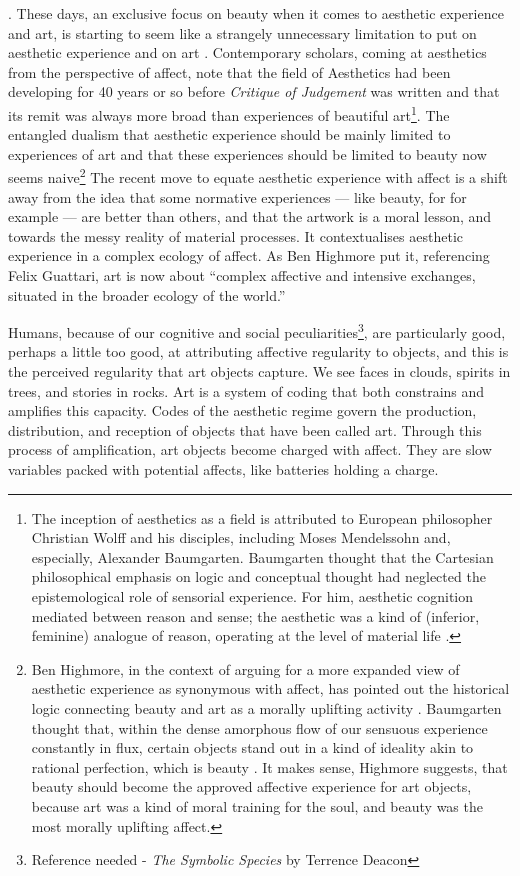 \documentclass[letterpaper]{article}
\begin{document}
{    }. These days, an exclusive focus on beauty when it comes to aesthetic experience and art, is starting to seem like a strangely unnecessary limitation to put on aesthetic experience and on art \citep[pp.121-122]{HighmoreBttrAftrTst2010}. Contemporary scholars, coming at aesthetics from the perspective of affect, note that the field of Aesthetics had been developing for 40 years or so before \emph{Critique of Judgement} was written and that its remit was always more broad than experiences of beautiful art\footnote{
        The inception of aesthetics as a field is attributed to European philosopher Christian Wolff and his disciples, including Moses Mendelssohn and, especially, Alexander Baumgarten. Baumgarten thought that the Cartesian philosophical emphasis on logic and conceptual thought had neglected the epistemological role of sensorial experience. For him, aesthetic cognition mediated between reason and sense; the aesthetic was a kind of (inferior, feminine) analogue of reason, operating at the level of material life \citep[pp.327-338]{EagletonFrPrtclrs1990}. 
    }. The entangled dualism that aesthetic experience should be mainly limited to experiences of art and that these experiences should be limited to beauty now seems naive\footnote{
        Ben Highmore, in the context of arguing for a more expanded view of aesthetic experience as synonymous with affect, has pointed out the historical logic connecting beauty and art as a morally uplifting activity \citep[p.121-122]{HighmoreBttrAftrTst2010}. Baumgarten thought that, within the dense amorphous flow of our sensuous experience constantly in flux, certain objects stand out in a kind of ideality akin to rational perfection, which is beauty \citep[p.328]{EagletonFrPrtclrs1990}. It makes sense, Highmore suggests, that beauty should become the approved affective experience for art objects, because art was a kind of moral training for the soul, and beauty was the most morally uplifting affect.
    } The recent move to equate aesthetic experience with affect is a shift away from the idea that some normative experiences — like beauty, for for example — are better than others, and that the artwork is a moral lesson, and towards the messy reality of material processes. It contextualises aesthetic experience in a complex ecology of affect. As Ben Highmore put it, referencing Felix Guattari, art is now about “complex affective and intensive exchanges, situated in the broader ecology of the world.” \citep[p.155]{HighmoreBttrAftrTst2010}

    Humans, because of our cognitive and social peculiarities\footnote{
        Reference needed - \emph{The Symbolic Species} by Terrence Deacon
    }, are particularly good, perhaps a little too good, at attributing affective regularity to objects, and this is the perceived regularity that art objects capture. We see faces in clouds, spirits in trees, and stories in rocks. Art is a system of coding that both constrains and amplifies this capacity. Codes of the aesthetic regime govern the production, distribution, and reception of objects that have been called art. Through this process of amplification, art objects become charged with affect. They are slow variables packed with potential affects, like batteries holding a charge.
\end{document}
